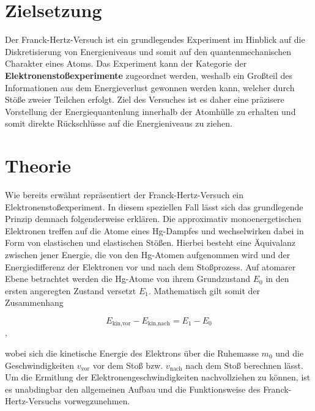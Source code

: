 



\section{Zielsetzung}
\label{sec:Zielsetung}

Der Franck-Hertz-Versuch ist ein grundlegendes Experiment im Hinblick auf die Diskretisierung von Energieniveaus und somit auf den quantenmechanischen 
Charakter eines Atoms. Das Experiment kann der Kategorie der \textbf{Elektronenstoßexperimente} zugeordnet werden, weshalb ein Großteil des Informationen 
aus dem Energieverlust gewonnen werden kann, welcher durch Stöße zweier Teilchen erfolgt. Ziel des Versuches ist es daher eine präzisere Vorstellung 
der Energiequantenlung innerhalb der Atomhülle zu erhalten und somit direkte Rückschlüsse auf die Energieniveaus zu ziehen.

\section{Theorie}
\label{sec:Theorie}

Wie bereits erwähnt repräsentiert der Franck-Hertz-Versuch ein Elektronenstoßexperiment. In diesem speziellen Fall lässt sich das grundlegende Prinzip 
demnach folgenderweise erklären. Die approximativ monoenergetischen Elektronen treffen auf die Atome eines Hg-Dampfes und wechselwirken dabei in Form von 
elastischen und elastischen Stößen. Hierbei besteht eine Äquivalanz zwischen jener Energie, die von den Hg-Atomen aufgenommen wird und der Energiedifferenz 
der Elektronen vor und nach dem Stoßprozess. Auf atomarer Ebene betrachtet werden die Hg-Atome von ihrem Grundzustand $E_0$ in den ersten angeregten
Zustand versetzt $E_1$. Mathematisch gilt somit der Zusammenhang 

\begin{equation*}
    E_\text{kin,vor} - E_\text{kin,nach} = E_1 - E_0
\end{equation*}, 

\noindent wobei sich die kinetische Energie des Elektrons über die Ruhemasse $m_0$ und die Geschwindigkeiten $v_\text{vor}$ vor dem Stoß bzw. $v_\text{nach}$
nach dem Stoß berechnen lässt. Um die Ermitlung der Elektronengeschwindigkeiten nachvollziehen zu können, ist es unabdingbar den allgemeinen Aufbau und die 
Funktionsweise des Franck-Hertz-Versuchs vorwegzunehmen.\\

